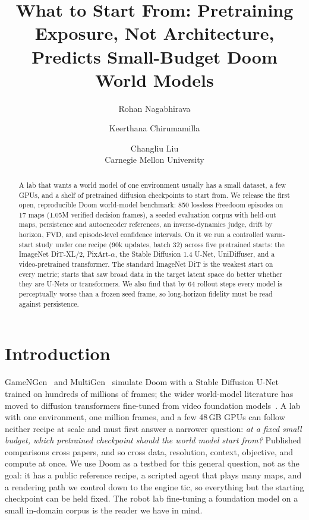 \documentclass[10pt]{article}
\title{What to Start From: Pretraining Exposure, Not Architecture,\\ Predicts Small-Budget Doom World Models}
\author{Rohan Nagabhirava \and Keerthana Chirumamilla \and Changliu Liu\\ Carnegie Mellon University}
\date{}
\begin{document}
\maketitle

\begin{abstract}
A lab that wants a world model of one environment usually has a small dataset, a few GPUs, and a shelf of pretrained diffusion checkpoints to start from. We release the first open, reproducible Doom world-model benchmark: 850 lossless Freedoom episodes on 17 maps (1.05M verified decision frames), a seeded evaluation corpus with held-out maps, persistence and autoencoder references, an inverse-dynamics judge, drift by horizon, FVD, and episode-level confidence intervals. On it we run a controlled warm-start study under one recipe (90k updates, batch 32) across five pretrained starts: the ImageNet DiT-XL/2, PixArt-$\alpha$, the Stable Diffusion 1.4 U-Net, UniDiffuser, and a video-pretrained transformer. The standard ImageNet DiT is the weakest start on every metric; starts that saw broad data in the target latent space do better whether they are U-Nets or transformers. We also find that by 64 rollout steps every model is perceptually worse than a frozen seed frame, so long-horizon fidelity must be read against persistence.
\end{abstract}

\section{Introduction}
GameNGen~\citep{valevski2024gamengen} and MultiGen~\citep{po2026multigen} simulate Doom with a Stable Diffusion U-Net trained on hundreds of millions of frames; the wider world-model literature has moved to diffusion transformers fine-tuned from video foundation models~\citep{he2025matrixgame2,oasis2024}. A lab with one environment, one million frames, and a few 48\,GB GPUs can follow neither recipe at scale and must first answer a narrower question: \emph{at a fixed small budget, which pretrained checkpoint should the world model start from?} Published comparisons cross papers, and so cross data, resolution, context, objective, and compute at once. We use Doom as a testbed for this general question, not as the goal: it has a public reference recipe, a scripted agent that plays many maps, and a rendering path we control down to the engine tic, so everything but the starting checkpoint can be held fixed. The robot lab fine-tuning a foundation model on a small in-domain corpus is the reader we have in mind.
\end{document}
